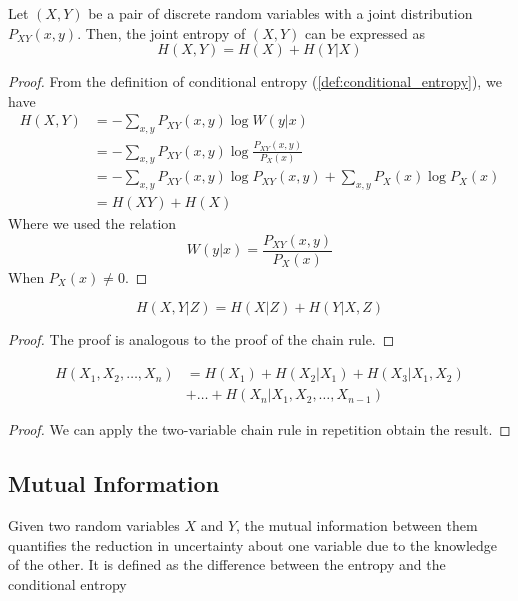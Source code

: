 \begin{theorem}\label{thm:chain_rule}
        Let $(X,Y)$ be a pair of discrete random variables with a joint distribution $P_{XY}(x,y)$. Then, the joint entropy of $(X,Y)$ can be expressed as 
    \begin{equation}
        H(X,Y) = H(X) + H(Y|X)
    \end{equation}
\end{theorem}
\begin{proof}
    From the definition of conditional entropy (\ref{def:conditional_entropy}), we have
    \begin{align*}
        H(X,Y) &= -\sum_{x,y} P_{XY}(x,y) \log W(y|x) \\
        &= -\sum_{x,y} P_{XY}(x,y) \log \frac{P_{XY}(x,y)}{P_X(x)} \\
        &= -\sum_{x,y} P_{XY}(x,y) \log P_{XY}(x,y) + \sum_{x,y} P_{X}(x) \log P_X(x) \\
        &= H(XY) + H(X)
    \end{align*}
    Where we used the relation
    \begin{equation}
        W(y|x) = \frac{P_{XY}(x,y)}{P_X(x)}
    \end{equation}
    When $P_X(x) \neq 0$.
\end{proof}

\begin{corollary}
    \begin{equation}
        H(X, Y|Z) = H(X|Z) + H(Y|X,Z)
    \end{equation}
\end{corollary}
\begin{proof}
    The proof is analogous to the proof of the chain rule.
\end{proof}

\begin{corollary}
    \begin{align}
        H(X_1, X_2, \ldots, X_n) &= H(X_1) + H(X_2|X_1) + H(X_3|X_1, X_2) \nonumber \\
        &+ \ldots + H(X_n|X_1, X_2, \ldots, X_{n-1})
    \end{align}
\end{corollary}
\begin{proof}
    We can apply the two-variable chain rule in repetition obtain the result.
\end{proof}

\subsection{Mutual Information}
Given two random variables $X$ and $Y$, the mutual information between them quantifies the reduction in uncertainty about one variable due to the knowledge of the other. It is defined as the difference between the entropy and the conditional entropy

